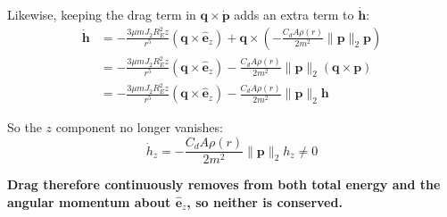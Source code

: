 \documentclass[titlepage]{article}
\begin{document}
\begin{mdframed}[linewidth=1pt, innertopmargin=10pt, innerbottommargin=10pt]
	Likewise, keeping the drag term in $\boldsymbol{q}\times\dot{\boldsymbol{p}}$ adds an extra term to $\dot{\boldsymbol{h}}$:
	\begin{equation}
		\begin{split}
			\dot{\boldsymbol{h}}&=-\frac{3\mu mJ_2R_E^2z}{r^5}\left(\boldsymbol{q}\times\hat{\boldsymbol{e}}_z\right)+\boldsymbol{q}\times\left(-\frac{C_dA\rho(r)}{2m^2}\|\boldsymbol{p}\|_2\boldsymbol{p}\right) \\
			&=-\frac{3\mu mJ_2R_E^2z}{r^5}\left(\boldsymbol{q}\times\hat{\boldsymbol{e}}_z\right)-\frac{C_dA\rho(r)}{2m^2}\|\boldsymbol{p}\|_2\left(\boldsymbol{q}\times\boldsymbol{p}\right) \\
			&=-\frac{3\mu mJ_2R_E^2z}{r^5}\left(\boldsymbol{q}\times\hat{\boldsymbol{e}}_z\right)-\frac{C_dA\rho(r)}{2m^2}\|\boldsymbol{p}\|_2\boldsymbol{h}
		\end{split}
	\end{equation}
	
	So the $z$ component no longer vanishes:
	\begin{equation}
		\dot{h}_z=-\frac{C_dA\rho(r)}{2m^2}\|\boldsymbol{p}\|_2h_z\neq0
	\end{equation}
	
	\textbf{Drag therefore continuously removes from both total energy and the angular momentum about $\hat{\boldsymbol{e}}_z$, so neither is conserved.}
\end{mdframed}
\end{document}
